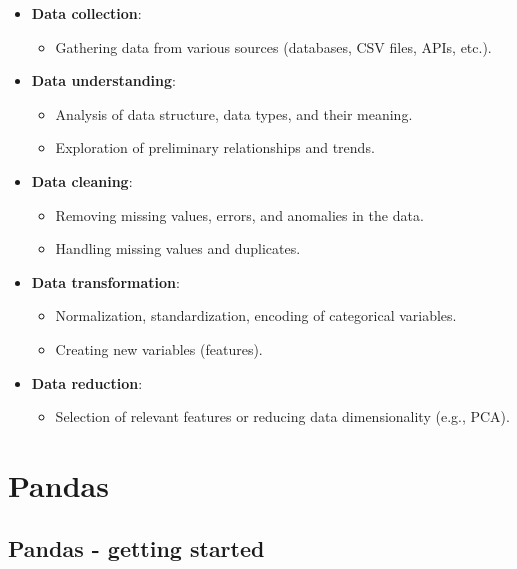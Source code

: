 \documentclass[
  english,
  letterpaper,
  DIV=11,
  numbers=noendperiod]{scrreprt}
\providecommand{\tightlist}{%
  \setlength{\itemsep}{0pt}\setlength{\parskip}{0pt}}
\begin{document}
\begin{itemize}
\tightlist
\item
  \textbf{Data collection}:

  \begin{itemize}
  \tightlist
  \item
    Gathering data from various sources (databases, CSV files, APIs,
    etc.).
  \end{itemize}
\item
  \textbf{Data understanding}:

  \begin{itemize}
  \tightlist
  \item
    Analysis of data structure, data types, and their meaning.
  \item
    Exploration of preliminary relationships and trends.
  \end{itemize}
\item
  \textbf{Data cleaning}:

  \begin{itemize}
  \tightlist
  \item
    Removing missing values, errors, and anomalies in the data.
  \item
    Handling missing values and duplicates.
  \end{itemize}
\item
  \textbf{Data transformation}:

  \begin{itemize}
  \tightlist
  \item
    Normalization, standardization, encoding of categorical variables.
  \item
    Creating new variables (features).
  \end{itemize}
\item
  \textbf{Data reduction}:

  \begin{itemize}
  \tightlist
  \item
    Selection of relevant features or reducing data dimensionality
    (e.g., PCA).
  \end{itemize}
\end{itemize}

\part{Pandas}

\chapter{Pandas - getting started}\label{pandas---getting-started}
\end{document}

